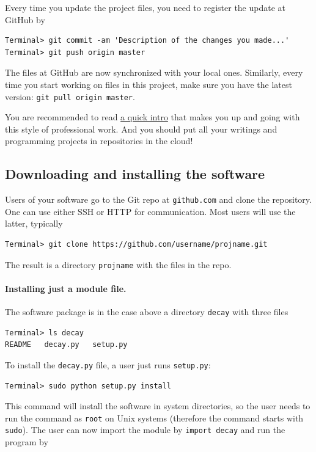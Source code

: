 \documentclass[%
oneside,                 %
final,                   %
10pt]{article}
\begin{document}
Every time you update the project files, you need to register
the update at GitHub by

\begin{Verbatim}[frame=lines,label=\fbox{{\tiny Terminal}},framesep=2.5mm,framerule=0.7pt,fontsize=\fontsize{9pt}{9pt}]
Terminal> git commit -am 'Description of the changes you made...'
Terminal> git push origin master
\end{Verbatim}
The files at GitHub are now synchronized with your local ones.
Similarly, every time you start working on files in this project,
make sure you have the latest version:
\texttt{git pull origin master}.

You are recommended to read \href{{http://hplgit.github.io/teamods/bitgit/html/}}{a quick intro} that makes you
up and going with this style of
professional work. And you should put all your writings and programming
projects in repositories in the cloud!

\subsection{Downloading and installing the software}

Users of your software go to the Git repo at \texttt{github.com} and
clone the repository. One can use either SSH or HTTP for communication.
Most users will use the latter, typically

\begin{Verbatim}[frame=lines,label=\fbox{{\tiny Terminal}},framesep=2.5mm,framerule=0.7pt,fontsize=\fontsize{9pt}{9pt}]
Terminal> git clone https://github.com/username/projname.git
\end{Verbatim}
The result is a directory \texttt{projname} with the files in the repo.

\paragraph{Installing just a module file.}
The software package is in the case above a directory \texttt{decay} with three files

\begin{Verbatim}[frame=lines,label=\fbox{{\tiny Terminal}},framesep=2.5mm,framerule=0.7pt,fontsize=\fontsize{9pt}{9pt}]
Terminal> ls decay
README   decay.py   setup.py
\end{Verbatim}
To install the \texttt{decay.py} file, a user
just runs \texttt{setup.py}:

\begin{Verbatim}[frame=lines,label=\fbox{{\tiny Terminal}},framesep=2.5mm,framerule=0.7pt,fontsize=\fontsize{9pt}{9pt}]
Terminal> sudo python setup.py install
\end{Verbatim}
This command will install the software in system directories, so the user
needs to run the command as \texttt{root} on Unix systems (therefore the command
starts with \texttt{sudo}).
The user can now import the module by \texttt{import decay} and run
the program by
\end{document}
